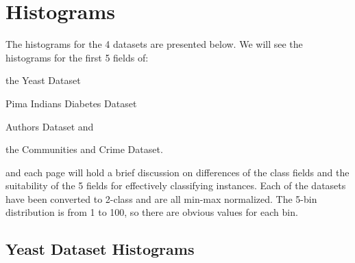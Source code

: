 \documentclass[a4paper,10pt]{article}
\begin{document}
    \section{Histograms}
      The histograms for the 4 datasets are presented below.
      We will see the histograms for the first 5 fields of: 
      \begin{inparaenum}[(1)]
        \item the Yeast Dataset
        \item Pima Indians Diabetes Dataset
        \item Authors Dataset and
        \item the Communities and Crime Dataset.
      \end{inparaenum}
       and each page will hold a brief discussion on differences of the class fields and the suitability
       of the 5 fields for effectively classifying instances. Each of the datasets have been converted to 
       2-class and are all min-max normalized. The 5-bin distribution is from 1 to 100, so there are obvious
       values for each bin.
                                                  
       \newpage
        \subsection{Yeast Dataset Histograms}
\end{document}
